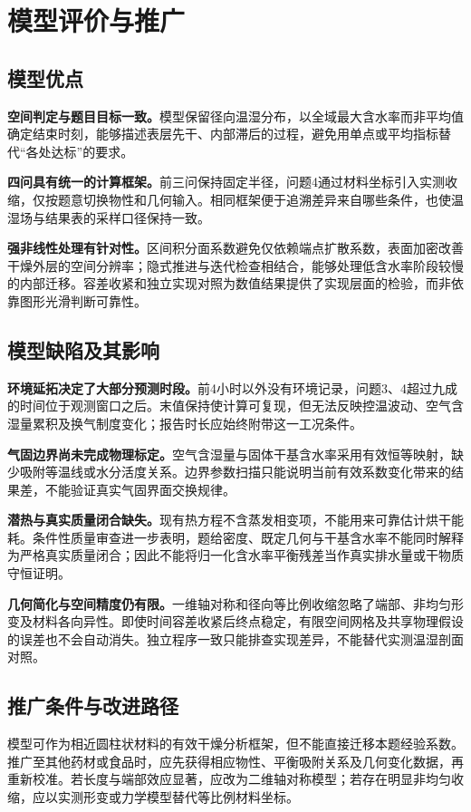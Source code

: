\documentclass[UTF8,zihao=-4,a4paper]{ctexart}
\begin{document}
\section{模型评价与推广}
\subsection{模型优点}
\textbf{空间判定与题目目标一致。}模型保留径向温湿分布，以全域最大含水率而非平均值确定结束时刻，能够描述表层先干、内部滞后的过程，避免用单点或平均指标替代“各处达标”的要求。

\textbf{四问具有统一的计算框架。}前三问保持固定半径，问题4通过材料坐标引入实测收缩，仅按题意切换物性和几何输入。相同框架便于追溯差异来自哪些条件，也使温湿场与结果表的采样口径保持一致。

\textbf{强非线性处理有针对性。}区间积分面系数避免仅依赖端点扩散系数，表面加密改善干燥外层的空间分辨率；隐式推进与迭代检查相结合，能够处理低含水率阶段较慢的内部迁移。容差收紧和独立实现对照为数值结果提供了实现层面的检验，而非依靠图形光滑判断可靠性。
\subsection{模型缺陷及其影响}
\textbf{环境延拓决定了大部分预测时段。}前4小时以外没有环境记录，问题3、4超过九成的时间位于观测窗口之后。末值保持使计算可复现，但无法反映控温波动、空气含湿量累积及换气制度变化；报告时长应始终附带这一工况条件。

\textbf{气固边界尚未完成物理标定。}空气含湿量与固体干基含水率采用有效恒等映射，缺少吸附等温线或水分活度关系。边界参数扫描只能说明当前有效系数变化带来的结果差，不能验证真实气固界面交换规律。

\textbf{潜热与真实质量闭合缺失。}现有热方程不含蒸发相变项，不能用来可靠估计烘干能耗。条件性质量审查进一步表明，题给密度、既定几何与干基含水率不能同时解释为严格真实质量闭合；因此不能将归一化含水率平衡残差当作真实排水量或干物质守恒证明。

\textbf{几何简化与空间精度仍有限。}一维轴对称和径向等比例收缩忽略了端部、非均匀形变及材料各向异性。即使时间容差收紧后终点稳定，有限空间网格及共享物理假设的误差也不会自动消失。独立程序一致只能排查实现差异，不能替代实测温湿剖面对照。
\subsection{推广条件与改进路径}
模型可作为相近圆柱状材料的有效干燥分析框架，但不能直接迁移本题经验系数。推广至其他药材或食品时，应先获得相应物性、平衡吸附关系及几何变化数据，再重新校准。若长度与端部效应显著，应改为二维轴对称模型；若存在明显非均匀收缩，应以实测形变或力学模型替代等比例材料坐标。
\end{document}
